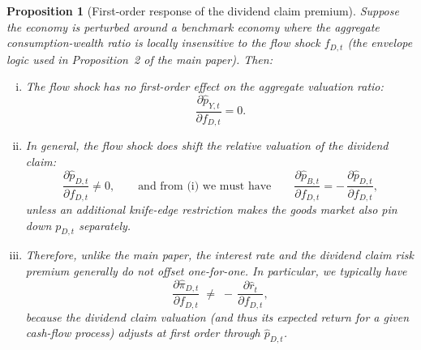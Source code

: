 \documentclass[11pt,english]{article}
\newtheorem{prop}{Proposition}
\begin{document}
\begin{prop}[First-order response of the dividend claim premium]\label{prop:first_order_dividend_claim}
Suppose the economy is perturbed around a benchmark economy where the aggregate consumption-wealth ratio is locally insensitive to the flow shock $f_{D,t}$ (the envelope logic used in Proposition~2 of the main paper). Then:
\begin{enumerate}[(i)]
    \item The flow shock has no first-order effect on the \emph{aggregate} valuation ratio:
    \[
        \frac{\partial \hat p_{Y,t}}{\partial f_{D,t}}=0.
    \]
    \item In general, the flow shock \emph{does} shift the \emph{relative} valuation of the dividend claim:
    \[
        \frac{\partial \hat p_{D,t}}{\partial f_{D,t}}\neq 0,
        \qquad\text{and from (i) we must have}\qquad
        \frac{\partial \hat p_{B,t}}{\partial f_{D,t}}=-\,\frac{\partial \hat p_{D,t}}{\partial f_{D,t}},
    \]
    unless an additional knife-edge restriction makes the goods market also pin down $p_{D,t}$ separately.
    \item Therefore, unlike the main paper, the interest rate and the dividend claim risk premium generally \emph{do not} offset one-for-one. In particular, %
    we typically have
    \[
        \frac{\partial \hat \pi_{D,t}}{\partial f_{D,t}}
        \;\neq\;
        -\,\frac{\partial \hat r_t}{\partial f_{D,t}},
    \]
    because the dividend claim valuation (and thus its expected return for a given cash-flow process) adjusts at first order through $\hat p_{D,t}$.
\end{enumerate}
\end{prop}
\end{document}
